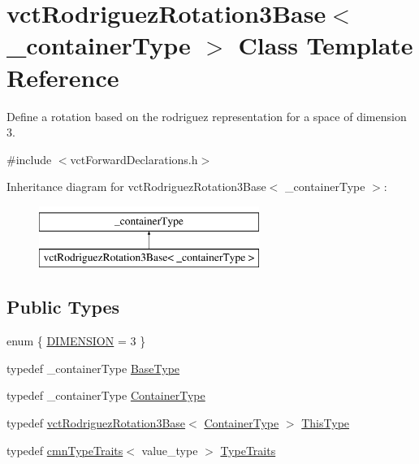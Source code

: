 \hypertarget{classvct_rodriguez_rotation3_base}{}\section{vct\+Rodriguez\+Rotation3\+Base$<$ \+\_\+container\+Type $>$ Class Template Reference}
\label{classvct_rodriguez_rotation3_base}


Define a rotation based on the rodriguez representation for a space of dimension 3.  




{\ttfamily \#include $<$vct\+Forward\+Declarations.\+h$>$}

Inheritance diagram for vct\+Rodriguez\+Rotation3\+Base$<$ \+\_\+container\+Type $>$\+:\begin{figure}[H]
\begin{center}
\leavevmode
\includegraphics[height=2.000000cm]{d4/d21/classvct_rodriguez_rotation3_base}
\end{center}
\end{figure}
\subsection*{Public Types}
\begin{DoxyCompactItemize}
\item 
enum \{ \hyperlink{classvct_rodriguez_rotation3_base_a37ad88df67e2e291c207a9d2892148c1a251299ef32f4c700fad09c8639bcce3a}{D\+I\+M\+E\+N\+S\+I\+O\+N} = 3
 \}
\item 
typedef \+\_\+container\+Type \hyperlink{classvct_rodriguez_rotation3_base_a4269d1ae12fda0dd92eccb3ad5089ce5}{Base\+Type}
\item 
typedef \+\_\+container\+Type \hyperlink{classvct_rodriguez_rotation3_base_a121aa7d7f143b0c59ef190ff9bff57d2}{Container\+Type}
\item 
typedef \hyperlink{classvct_rodriguez_rotation3_base}{vct\+Rodriguez\+Rotation3\+Base}$<$ \hyperlink{classvct_rodriguez_rotation3_base_a121aa7d7f143b0c59ef190ff9bff57d2}{Container\+Type} $>$ \hyperlink{classvct_rodriguez_rotation3_base_add2bccab7f6e86c98b3f97fd00b06dcc}{This\+Type}
\item 
typedef \hyperlink{classcmn_type_traits}{cmn\+Type\+Traits}$<$ value\+\_\+type $>$ \hyperlink{classvct_rodriguez_rotation3_base_a862714ccf1a5b0f77a49e7983204474f}{Type\+Traits}
\end{DoxyCompactItemize}
